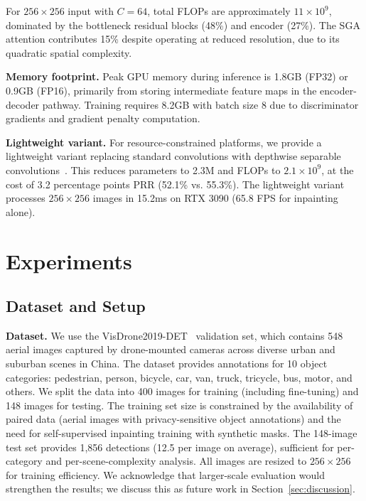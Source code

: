 \documentclass[preprint,12pt]{elsarticle}
\begin{document}
For $256 \times 256$ input with $C=64$, total FLOPs are approximately $11 \times 10^9$, dominated by the bottleneck residual blocks (48\%) and encoder (27\%). The SGA attention contributes 15\% despite operating at reduced resolution, due to its quadratic spatial complexity.

\textbf{Memory footprint.} Peak GPU memory during inference is 1.8GB (FP32) or 0.9GB (FP16), primarily from storing intermediate feature maps in the encoder-decoder pathway. Training requires 8.2GB with batch size 8 due to discriminator gradients and gradient penalty computation.

\textbf{Lightweight variant.} For resource-constrained platforms, we provide a lightweight variant replacing standard convolutions with depthwise separable convolutions~\cite{howard2019searching}. This reduces parameters to 2.3M and FLOPs to $2.1 \times 10^9$, at the cost of 3.2 percentage points PRR (52.1\% vs. 55.3\%). The lightweight variant processes $256 \times 256$ images in 15.2ms on RTX 3090 (65.8 FPS for inpainting alone).


\section{Experiments}
\label{sec:experiments}

\subsection{Dataset and Setup}

\textbf{Dataset.} We use the VisDrone2019-DET~\cite{visdrone2019} validation set, which contains 548 aerial images captured by drone-mounted cameras across diverse urban and suburban scenes in China. The dataset provides annotations for 10 object categories: pedestrian, person, bicycle, car, van, truck, tricycle, bus, motor, and others. We split the data into 400 images for training (including fine-tuning) and 148 images for testing. The training set size is constrained by the availability of paired data (aerial images with privacy-sensitive object annotations) and the need for self-supervised inpainting training with synthetic masks. The 148-image test set provides 1,856 detections (12.5 per image on average), sufficient for per-category and per-scene-complexity analysis. All images are resized to $256 \times 256$ for training efficiency. We acknowledge that larger-scale evaluation would strengthen the results; we discuss this as future work in Section~\ref{sec:discussion}.
\end{document}
